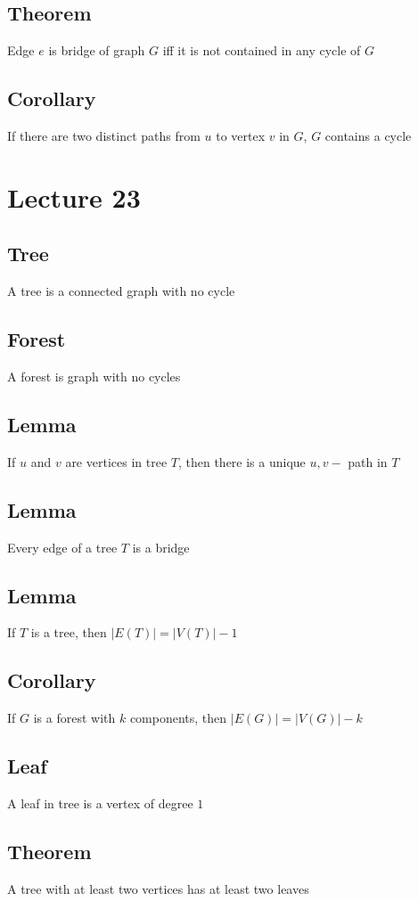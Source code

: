 \documentclass[11pt]{article}
\begin{document}
\subsection{Theorem}
Edge $e$ is bridge of graph $G$ iff it is not contained in any cycle of $G$
\subsection{Corollary}
If there are two distinct paths from $u$ to vertex $v$ in $G$, $G$ contains a cycle 

\section{Lecture 23}
\subsection{Tree}
A tree is a connected graph with no cycle 
\subsection{Forest}
A forest is graph with no cycles
\subsection{Lemma}
If $u$ and $v$ are vertices in tree $T$, then there is a unique $u,v-$ path in $T$
\subsection{Lemma}
Every edge of a tree $T$ is a bridge
\subsection{Lemma}
If $T$ is a tree, then $|E(T)| = |V(T)|-1$
\subsection{Corollary}
If $G$ is a forest with $k$ components, then $|E(G)| = |V(G)|-k$
\subsection{Leaf}
A leaf in tree is a vertex of degree $1$
\subsection{Theorem}
A tree with at least two vertices has at least two leaves
\end{document}
